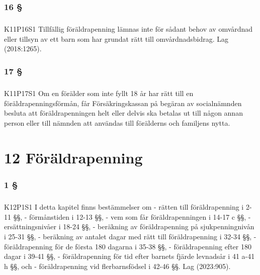 \documentclass[a4paper,notitlepage,openany,10pt]{book}
\begin{document}
\subsection*{16 §}
\paragraph*{}
{\tiny K11P16S1}
Tillfällig föräldrapenning lämnas inte för sådant behov av omvårdnad eller tillsyn av ett barn som har grundat rätt till omvårdnadsbidrag.
Lag (2018:1265).
\subsection*{17 §}
\paragraph*{}
{\tiny K11P17S1}
Om en förälder som inte fyllt 18 år har rätt till en föräldrapenningsförmån, får Försäkringskassan på begäran av socialnämnden besluta att föräldrapenningen helt eller delvis ska betalas ut till någon annan person eller till nämnden att användas till förälderns och familjens nytta.
\chapter*{12 Föräldrapenning}
\subsection*{1 §}
\paragraph*{}
{\tiny K12P1S1}
I detta kapitel finns bestämmelser om
\newline - rätten till föräldrapenning i 2-11 §§,
\newline - förmånstiden i 12-13 §§,
\newline - vem som får föräldrapenningen i 14-17 c §§,
\newline - ersättningsnivåer i 18-24 §§,
\newline - beräkning av föräldrapenning på sjukpenningnivån i 25-31 §§,
\newline - beräkning av antalet dagar med rätt till föräldrapenning i 32-34 §§,
\newline - föräldrapenning för de första 180 dagarna i 35-38 §§,
\newline - föräldrapenning efter 180 dagar i 39-41 §§,
\newline - föräldrapenning för tid efter barnets fjärde levnadsår i 41 a-41 h §§, och
\newline - föräldrapenning vid flerbarnsfödsel i 42-46 §§.
Lag (2023:905).
\end{document}
